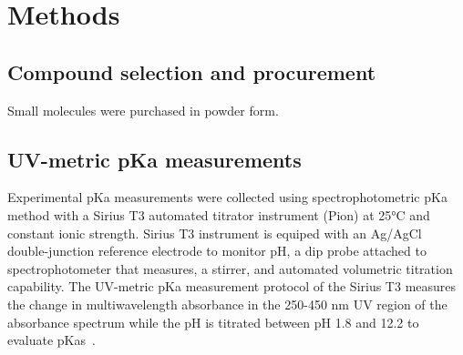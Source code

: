\documentclass[9pt,lineno]{elife}
\begin{document}

\section{Methods}

\subsection{Compound selection and procurement}
Small molecules were purchased in powder form.


\subsection{UV-metric pKa measurements}

Experimental pKa measurements were collected using spectrophotometric pKa method with a Sirius T3 automated titrator instrument (Pion) at 25°C and constant ionic strength. Sirius T3 instrument is equiped with an Ag/AgCl double-junction reference electrode to monitor pH, a dip probe attached to spectrophotometer that measures, a stirrer, and automated volumetric titration capability. The UV-metric pKa measurement protocol of the Sirius T3 measures the change in multiwavelength absorbance in the 250-450 nm UV region of the absorbance spectrum while the pH is titrated between pH 1.8 and 12.2 to evaluate pKas~\citep{tam_multi-wavelength_2001, allen_multiwavelength_1998}. 
\end{document}
